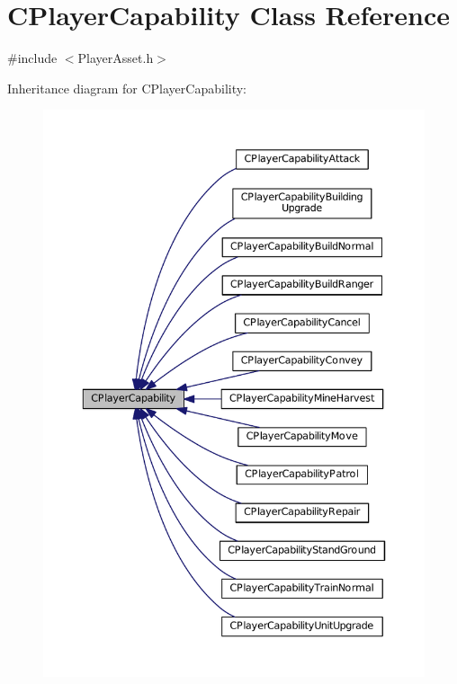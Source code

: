 \hypertarget{classCPlayerCapability}{}\section{C\+Player\+Capability Class Reference}
\label{classCPlayerCapability}


{\ttfamily \#include $<$Player\+Asset.\+h$>$}



Inheritance diagram for C\+Player\+Capability\+:\nopagebreak
\begin{figure}[H]
\begin{center}
\leavevmode
\includegraphics[width=350pt]{classCPlayerCapability__inherit__graph}
\end{center}
\end{figure}
